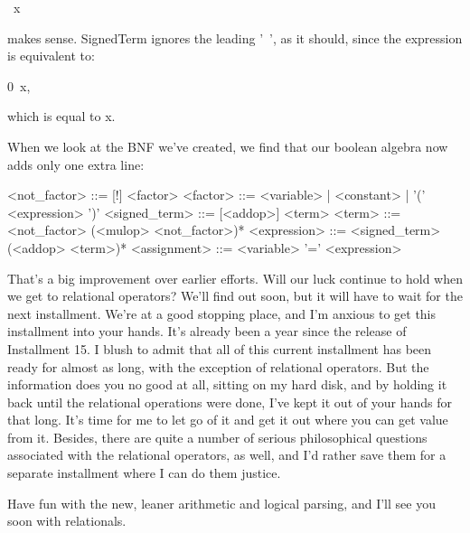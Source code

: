 \documentclass[float=false, crop=false]{standalone}
\begin{document}
	~x

makes sense.  SignedTerm ignores the leading '~', as it should, since
the expression is equivalent to:

	0~x,

which is equal to x.

When we look at the BNF we've created, we find that our boolean algebra
now adds only one extra line:


<not_factor> 	::= [!] <factor>
<factor>      	::= <variable> | <constant> | '(' <expression> ')'
<signed_term> 	::= [<addop>] <term>
<term>        	::= <not_factor> (<mulop> <not_factor>)*
<expression>  	::= <signed_term> (<addop> <term>)*
<assignment>  	::= <variable> '=' <expression>


That's a big improvement over earlier efforts. Will our luck continue to hold
when we get to relational operators? We'll find out soon, but it will have to
wait for the next installment. We're at a good stopping place, and I'm anxious
to get this installment into your hands. It's already been a year since the
release of Installment 15. I blush to admit that all of this current installment
has been ready for almost as long, with the exception of relational operators.
But the information does you no good at all, sitting on my hard disk, and by
holding it back until the relational operations were done, I've kept it out of
your hands for that long. It's time for me to let go of it and get it out where
you can get value from it. Besides, there are quite a number of serious
philosophical questions associated with the relational operators, as well, and
I'd rather save them for a separate installment where I can do them justice.

Have fun with the new, leaner arithmetic and logical parsing, and I'll see you
soon with relationals.
\end{document}

